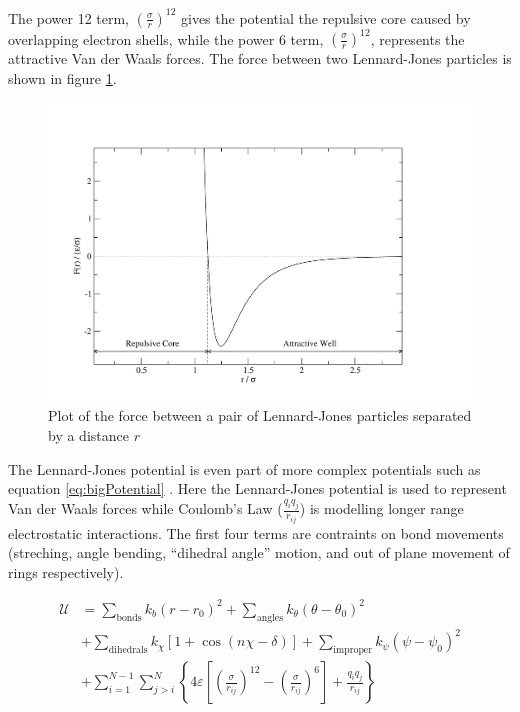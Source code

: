 \documentclass[12pt]{UoAthesis}
\begin{document}
The power 12 term, $\left(\frac{\sigma}{r}\right)^{12}$ gives the
potential the repulsive core caused by overlapping electron shells,
while the power 6 term, $\left(\frac{\sigma}{r}\right)^{12}$,
represents the attractive Van der Waals forces.  The force between two
Lennard-Jones particles is shown in figure \ref{fig:ljForce}.

\begin{figure}[htp] 
  \begin{center}
    \includegraphics[clip,width=\textwidth]{figures/ljForce} 
    \caption{\label{fig:ljForce} Plot of the force between
      a pair of Lennard-Jones particles separated by a distance $r$}
  \end{center}
\end{figure}

The Lennard-Jones potential is even part of more complex potentials
such as equation \eqref{eq:bigPotential} \cite{Maginn2010}.  Here the
Lennard-Jones potential is used to represent Van der Waals forces while
Coulomb's Law ($\frac{q_iq_j}{r_{ij}}$) is modelling longer range
electrostatic interactions.  The first four terms are contraints on
bond movements (streching, angle bending, ``dihedral angle'' motion,
and out of plane movement of rings respectively).

\begin{align}
  \label{eq:bigPotential}
  \mathcal{U} &= \sum_{\text{bonds}}k_b(r-r_0)^2 
  + \sum_{\text{angles}}k_\theta(\theta - \theta_0)^2 \nonumber\\
  &+ \sum_{\text{dihedrals}} k_\chi[1+\cos(n\chi - \delta)] 
  + \sum_{\text{improper}} k_\psi(\psi - \psi_0)^2 \nonumber\\
  &+ \sum_{i=1}^{N-1}\sum_{j>i}^{N}\left\{ 4 \varepsilon 
    \left[ \left( \frac{\sigma}{r_{ij}} \right)^{12}
      -\left( \frac{\sigma}{r_{ij}} \right)^{6} \right] 
    + \frac{q_iq_j}{r_{ij}}\right\}
\end{align}
\end{document}
